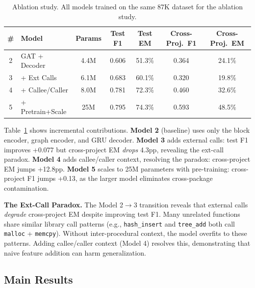 \documentclass[sigconf,nonacm]{acmart}
\begin{document}
\begin{table}[t]
    \centering
    \caption{Ablation study. All models trained on the same 87K dataset for the ablation study.}
    \label{tab:ablation}
    \footnotesize
    \setlength{\tabcolsep}{4pt}
    \begin{tabular}{clccccc}
        \toprule
        \textbf{\#} & \textbf{Model} & \textbf{Params} & \textbf{Test F1} & \textbf{Test EM} & \textbf{Cross-Proj.\ F1} & \textbf{Cross-Proj.\ EM} \\
        \midrule
        2 & GAT + Decoder & 4.4M & 0.606 & 51.3\% & 0.364 & 24.1\% \\
        3 & + Ext Calls & 6.1M & 0.683 & 60.1\% & 0.320 & 19.8\% \\
        4 & + Callee/Caller & 8.0M & 0.781 & 72.3\% & 0.460 & 32.6\% \\
        5 & + Pretrain+Scale & 25M & 0.795 & 74.3\% & 0.593 & 48.5\% \\
        \bottomrule
    \end{tabular}
\end{table}

Table~\ref{tab:ablation} shows incremental contributions. \textbf{Model 2} (baseline) uses only the block encoder, graph encoder, and GRU decoder. \textbf{Model 3} adds external calls: test F1 improves +0.077 but cross-project EM \emph{drops} 4.3pp, revealing the ext-call paradox. \textbf{Model 4} adds callee/caller context, resolving the paradox: cross-project EM jumps +12.8pp. \textbf{Model 5} scales to 25M parameters with pre-training: cross-project F1 jumps +0.13, as the larger model eliminates cross-package contamination.

\textbf{The Ext-Call Paradox.} The Model 2$\to$3 transition reveals that external calls \emph{degrade} cross-project EM despite improving test F1. Many unrelated functions share similar library call patterns (e.g., \texttt{hash\_insert} and \texttt{tree\_add} both call \texttt{malloc} + \texttt{memcpy}). Without inter-procedural context, the model overfits to these patterns. Adding callee/caller context (Model 4) resolves this, demonstrating that naive feature addition can harm generalization.

\subsection{Main Results}
\end{document}
